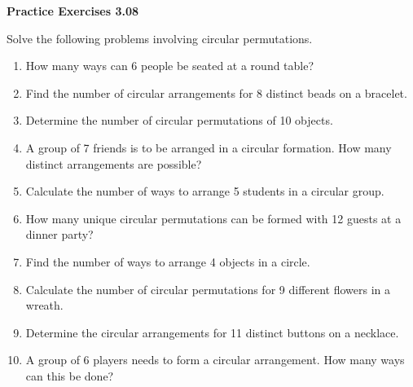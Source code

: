 \vspace{0.3ex}
\noindent\textbf{Practice Exercises 3.08}

\vspace{0.2ex}

Solve the following problems involving circular permutations.

\begin{enumerate}[label=\color{blue}\arabic*.]
    \item How many ways can 6 people be seated at a round table?
    \item Find the number of circular arrangements for 8 distinct beads on a bracelet.
    \item Determine the number of circular permutations of 10 objects.
    \item A group of 7 friends is to be arranged in a circular formation. How many distinct arrangements are possible?
    \item Calculate the number of ways to arrange 5 students in a circular group.
    \item How many unique circular permutations can be formed with 12 guests at a dinner party?
    \item Find the number of ways to arrange 4 objects in a circle.
    \item Calculate the number of circular permutations for 9 different flowers in a wreath.
    \item Determine the circular arrangements for 11 distinct buttons on a necklace.
    \item A group of 6 players needs to form a circular arrangement. How many ways can this be done?
\end{enumerate}
